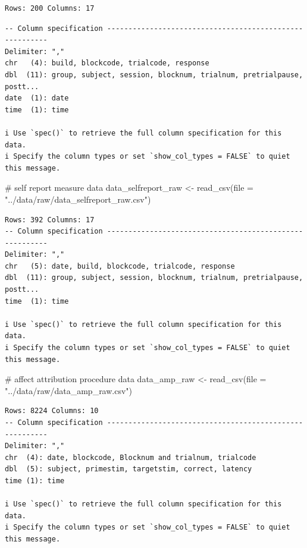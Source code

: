 \documentclass[
  letterpaper,
  DIV=11,
  numbers=noendperiod]{scrreprt}
\newenvironment{Shaded}{\begin{snugshade}}{\end{snugshade}}
\newcommand{\AttributeTok}[1]{\textcolor[rgb]{0.40,0.45,0.13}{#1}}
\newcommand{\CommentTok}[1]{\textcolor[rgb]{0.37,0.37,0.37}{#1}}
\newcommand{\FunctionTok}[1]{\textcolor[rgb]{0.28,0.35,0.67}{#1}}
\newcommand{\NormalTok}[1]{\textcolor[rgb]{0.00,0.23,0.31}{#1}}
\newcommand{\OtherTok}[1]{\textcolor[rgb]{0.00,0.23,0.31}{#1}}
\newcommand{\StringTok}[1]{\textcolor[rgb]{0.13,0.47,0.30}{#1}}
\begin{document}
\begin{verbatim}
Rows: 200 Columns: 17
\end{verbatim}

\begin{verbatim}
-- Column specification --------------------------------------------------------
Delimiter: ","
chr   (4): build, blockcode, trialcode, response
dbl  (11): group, subject, session, blocknum, trialnum, pretrialpause, postt...
date  (1): date
time  (1): time

i Use `spec()` to retrieve the full column specification for this data.
i Specify the column types or set `show_col_types = FALSE` to quiet this message.
\end{verbatim}

\begin{Shaded}
\begin{Highlighting}[]
\CommentTok{\# self report measure data}
\NormalTok{data\_selfreport\_raw }\OtherTok{\textless{}{-}} \FunctionTok{read\_csv}\NormalTok{(}\AttributeTok{file =} \StringTok{"../data/raw/data\_selfreport\_raw.csv"}\NormalTok{) }
\end{Highlighting}
\end{Shaded}

\begin{verbatim}
Rows: 392 Columns: 17
-- Column specification --------------------------------------------------------
Delimiter: ","
chr   (5): date, build, blockcode, trialcode, response
dbl  (11): group, subject, session, blocknum, trialnum, pretrialpause, postt...
time  (1): time

i Use `spec()` to retrieve the full column specification for this data.
i Specify the column types or set `show_col_types = FALSE` to quiet this message.
\end{verbatim}

\begin{Shaded}
\begin{Highlighting}[]
\CommentTok{\# affect attribution procedure data}
\NormalTok{data\_amp\_raw }\OtherTok{\textless{}{-}} \FunctionTok{read\_csv}\NormalTok{(}\AttributeTok{file =} \StringTok{"../data/raw/data\_amp\_raw.csv"}\NormalTok{)}
\end{Highlighting}
\end{Shaded}

\begin{verbatim}
Rows: 8224 Columns: 10
-- Column specification --------------------------------------------------------
Delimiter: ","
chr  (4): date, blockcode, Blocknum and trialnum, trialcode
dbl  (5): subject, primestim, targetstim, correct, latency
time (1): time

i Use `spec()` to retrieve the full column specification for this data.
i Specify the column types or set `show_col_types = FALSE` to quiet this message.
\end{verbatim}
\end{document}
